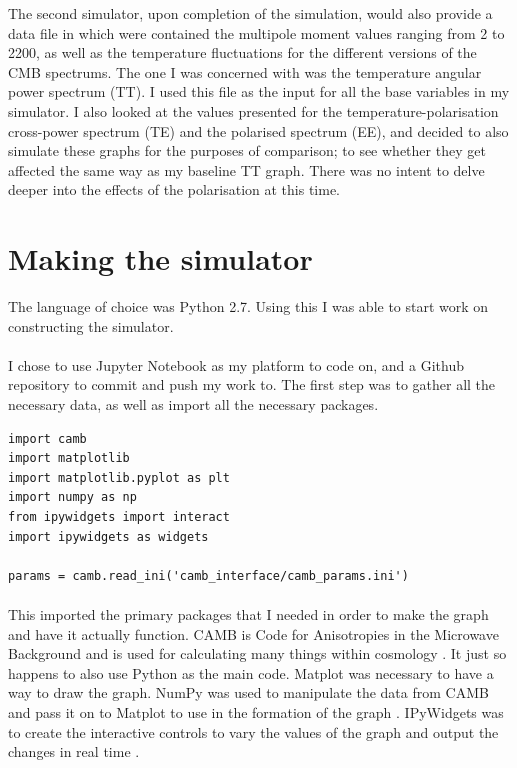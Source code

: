 \documentclass[twoside, fontsize=12pt,
     bibliography=totoc, %
     listof=totoc, %
     index=totoc, %
     onehalfspacing %
]{_MScDiss2017_cls}
\begin{document}
The second simulator, upon completion of the simulation, would also provide a data file in which were contained the multipole moment values ranging from 2 to 2200, as well as the temperature fluctuations for the different versions of the CMB spectrums. The one I was concerned with was the temperature angular power spectrum (TT). I used this file as the input for all the base variables in my simulator. I also looked at the values presented  for the temperature-polarisation cross-power spectrum (TE) and the polarised spectrum (EE), and decided to also simulate these graphs for the purposes of comparison; to see whether they get affected the same way as my baseline TT graph. There was no intent to delve deeper into the effects of the polarisation at this time.

\section{Making the simulator}

The language of choice was Python 2.7. Using this I was able to start work on constructing the simulator.

\paragraph{}

I chose to use Jupyter Notebook \cite{JupyterNotebook} as my platform to code on, and a Github repository \cite{Github} to commit and push my work to. The first step was to gather all the necessary data, as well as import all the necessary packages. 

\begin{lstfloat}
\begin{lstlisting}[caption={Setting up}, captionpos=b]
import camb
import matplotlib
import matplotlib.pyplot as plt
import numpy as np
from ipywidgets import interact
import ipywidgets as widgets

params = camb.read_ini('camb_interface/camb_params.ini')
\end{lstlisting}
\end{lstfloat}

\paragraph{}
This imported the primary packages that I needed in order to make the graph and have it actually function. CAMB is Code for Anisotropies in the Microwave Background and is used for calculating many things within cosmology \cite{PythonCAMB}. It just so happens to also use Python as the main code. Matplot was necessary to have a way to draw the graph. NumPy was used to manipulate the data from CAMB and pass it on to Matplot to use in the formation of the graph \cite{numpy}. IPyWidgets was to create the interactive controls to vary the values of the graph and output the changes in real time \cite{widgets}.
\end{document}
